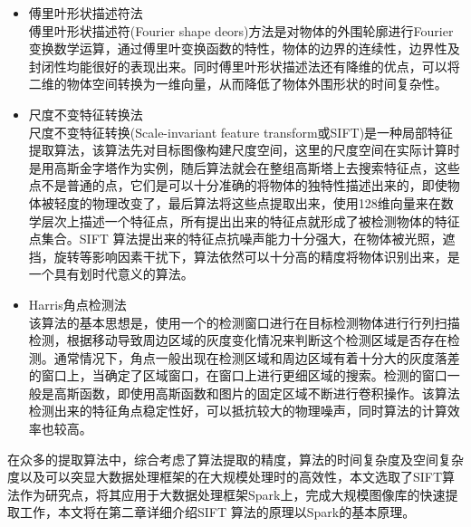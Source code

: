 \begin{itemize}
\item 傅里叶形状描述符法\\傅里叶形状描述符(Fourier shape deors)方法是对物体的外围轮廓进行Fourier变换数学运算，通过傅里叶变换函数的特性，物体的边界的连续性，边界性及封闭性均能很好的表现出来。同时傅里叶形状描述法还有降维的优点，可以将二维的物体空间转换为一维向量，从而降低了物体外围形状的时间复杂性。
\item 尺度不变特征转换法\\尺度不变特征转换(Scale-invariant feature transform或SIFT)是一种局部特征提取算法，该算法先对目标图像构建尺度空间，这里的尺度空间在实际计算时是用高斯金字塔作为实例，随后算法就会在整组高斯塔上去搜索特征点，这些点不是普通的点，它们是可以十分准确的将物体的独特性描述出来的，即使物体被轻度的物理改变了，最后算法将这些点提取出来，使用128维向量来在数学层次上描述一个特征点，所有提出出来的特征点就形成了被检测物体的特征点集合。SIFT 算法提出来的特征点抗噪声能力十分强大，在物体被光照，遮挡，旋转等影响因素干扰下，算法依然可以十分高的精度将物体识别出来，是一个具有划时代意义的算法。
\item Harris角点检测法\\该算法的基本思想是，使用一个的检测窗口进行在目标检测物体进行行列扫描检测，根据移动导致周边区域的灰度变化情况来判断这个检测区域是否存在检测。通常情况下，角点一般出现在检测区域和周边区域有着十分大的灰度落差的窗口上，当确定了区域窗口，在窗口上进行更细区域的搜索。检测的窗口一般是高斯函数，即使用高斯函数和图片的固定区域不断进行卷积操作。该算法检测出来的特征角点稳定性好，可以抵抗较大的物理噪声，同时算法的计算效率也较高。
\end{itemize}

在众多的提取算法中，综合考虑了算法提取的精度，算法的时间复杂度及空间复杂度以及可以突显大数据处理框架的在大规模处理时的高效性，本文选取了SIFT算法作为研究点，将其应用于大数据处理框架Spark上，完成大规模图像库的快速提取工作，本文将在第二章详细介绍SIFT 算法的原理以Spark的基本原理。

